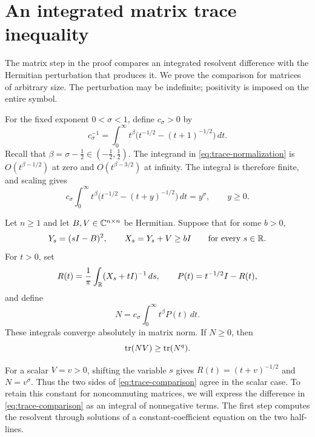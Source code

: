 \section{An integrated matrix trace inequality}\label{sec:trace}

The matrix step in the proof compares an integrated resolvent
difference with the Hermitian perturbation that produces it.
We prove the comparison for matrices of arbitrary size.  The
perturbation may be indefinite; positivity is imposed on the entire
symbol.

For the fixed exponent $0<\sigma<1$, define $c_\sigma>0$ by
\begin{equation}\label{eq:trace-normalization}
 c_\sigma^{-1}
 =\int_0^\infty t^\beta
       \bigl(t^{-1/2}-(t+1)^{-1/2}\bigr)\,dt.
\end{equation}
Recall that $\beta=\sigma-\tfrac12\in(-\tfrac12,\tfrac12)$.
The integrand in \eqref{eq:trace-normalization} is
$O(t^{\beta-1/2})$ at zero and $O(t^{\beta-3/2})$ at infinity.
The integral is therefore finite, and scaling gives
\begin{equation}\label{eq:trace-scaling}
 c_\sigma\int_0^\infty t^\beta
       \bigl(t^{-1/2}-(t+y)^{-1/2}\bigr)\,dt=y^\sigma,
 \qquad y\geq0.
\end{equation}

\begin{theorem}\label{thm:trace}
Let $n\geq1$ and let $B,V\in\mathbb C^{n\times n}$ be Hermitian.
Suppose that for some $b>0$,
\begin{equation}\label{eq:trace-symbol}
 Y_s=(sI-B)^2,\qquad X_s=Y_s+V\geq bI
 \qquad\text{for every }s\in\mathbb R.
\end{equation}
For $t>0$, set
\begin{equation}\label{eq:trace-resolvents}
 R(t)=\frac1\pi\int_\mathbb R(X_s+tI)^{-1}\,ds,
 \qquad P(t)=t^{-1/2}I-R(t),
\end{equation}
and define
\begin{equation}\label{eq:trace-N}
 N=c_\sigma\int_0^\infty t^\beta P(t)\,dt.
\end{equation}
These integrals converge absolutely in matrix norm.  If $N\geq0$, then
\begin{equation}\label{eq:trace-comparison}
                         \operatorname{tr}(NV)\geq\operatorname{tr}(N^q).
\end{equation}
\end{theorem}

For a scalar $V=v>0$, shifting the variable $s$ gives
$R(t)=(t+v)^{-1/2}$ and $N=v^\sigma$.  Thus the two sides of
\eqref{eq:trace-comparison} agree in the scalar case.  To retain this
constant for noncommuting matrices, we will express the difference in
\eqref{eq:trace-comparison} as an integral of nonnegative terms.
The first step computes the resolvent through solutions of a
constant-coefficient equation on the two half-lines.

